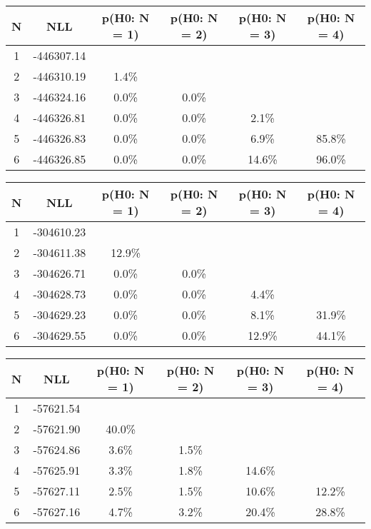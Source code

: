 \begin{table}[htb]
	\begin{center}
{\footnotesize\renewcommand{\arraystretch}{1.4}
		\begin{tabular}{cc||cccc}
			N & NLL & p(H0: N = 1) & p(H0: N = 2) & p(H0: N = 3) & p(H0: N = 4)\\ 
		\hline
1 & -446307.14 & & & & \\
2 & -446310.19 & 1.4\% & & & \\
3 & -446324.16 & 0.0\% & 0.0\% & & \\
4 & -446326.81 & 0.0\% & 0.0\% & 2.1\% & \\
5 & -446326.83 & 0.0\% & 0.0\% & 6.9\% & 85.8\% \\
6 & -446326.85 & 0.0\% & 0.0\% & 14.6\% & 96.0\% \\
	\end{tabular}
		\label{tab:lab}
	}
	\end{center}\end{table}

\begin{table}[htb]
	\begin{center}
{\footnotesize\renewcommand{\arraystretch}{1.4}
		\begin{tabular}{cc||cccc}
			N & NLL & p(H0: N = 1) & p(H0: N = 2) & p(H0: N = 3) & p(H0: N = 4)\\ 
		\hline
1 & -304610.23 & & & & \\
2 & -304611.38 & 12.9\% & & & \\
3 & -304626.71 & 0.0\% & 0.0\% & & \\
4 & -304628.73 & 0.0\% & 0.0\% & 4.4\% & \\
5 & -304629.23 & 0.0\% & 0.0\% & 8.1\% & 31.9\% \\
6 & -304629.55 & 0.0\% & 0.0\% & 12.9\% & 44.1\% \\
	\end{tabular}
		\label{tab:lab}
	}
	\end{center}\end{table}

\begin{table}[htb]
	\begin{center}
{\footnotesize\renewcommand{\arraystretch}{1.4}
		\begin{tabular}{cc||cccc}
			N & NLL & p(H0: N = 1) & p(H0: N = 2) & p(H0: N = 3) & p(H0: N = 4)\\ 
		\hline
1 & -57621.54 & & & & \\
2 & -57621.90 & 40.0\% & & & \\
3 & -57624.86 & 3.6\% & 1.5\% & & \\
4 & -57625.91 & 3.3\% & 1.8\% & 14.6\% & \\
5 & -57627.11 & 2.5\% & 1.5\% & 10.6\% & 12.2\% \\
6 & -57627.16 & 4.7\% & 3.2\% & 20.4\% & 28.8\% \\
	\end{tabular}
		\label{tab:lab}
	}
	\end{center}\end{table}


